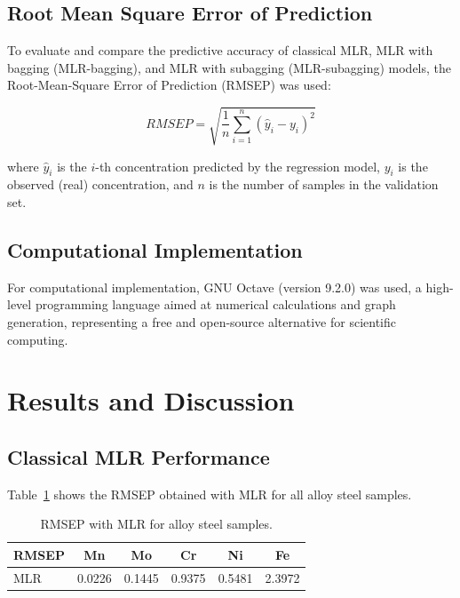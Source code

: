 \documentclass[12pt]{article}
\begin{document}
\subsection{Root Mean Square Error of Prediction}

To evaluate and compare the predictive accuracy of classical MLR, MLR with bagging (MLR-bagging), and MLR with subagging (MLR-subagging) models, the Root-Mean-Square Error of Prediction (RMSEP) was used:

\begin{equation}
RMSEP = \sqrt{\frac{1}{n}\sum_{i=1}^{n}(\hat{y}_i - y_i)^2}
\end{equation}

\noindent where $\hat{y}_i$ is the $i$-th concentration predicted by the regression model, $y_i$ is the observed (real) concentration, and $n$ is the number of samples in the validation set.

\subsection{Computational Implementation}

For computational implementation, GNU Octave (version 9.2.0) was used, a high-level programming language aimed at numerical calculations and graph generation, representing a free and open-source alternative for scientific computing.\cite{John:2025}

\section{Results and Discussion}

\subsection{Classical MLR Performance}

Table~\ref{tab:mlr_results} shows the RMSEP obtained with MLR for all alloy steel samples.

\begin{table}[H]
\centering
\caption{RMSEP with MLR for alloy steel samples.}
\label{tab:mlr_results}
\begin{tabular}{lccccc}
\toprule
RMSEP & Mn & Mo & Cr & Ni & Fe \\
\midrule
MLR & 0.0226 & 0.1445 & 0.9375 & 0.5481 & 2.3972 \\
\bottomrule
\end{tabular}
\end{table}
\end{document}
